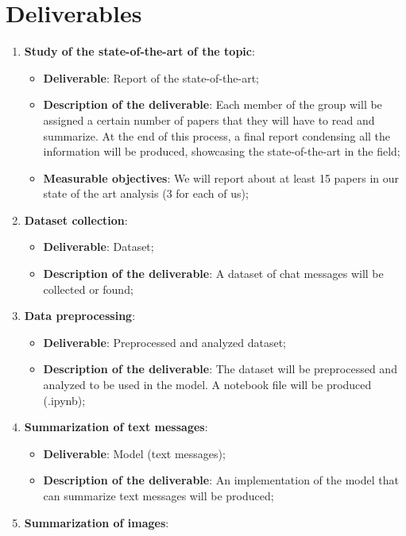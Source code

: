 \documentclass[12pt]{article}
\begin{document}
\section{Deliverables}
\begin{enumerate}
    \item \textbf{Study of the state-of-the-art of the topic}:
    \begin{itemize}
        \item \textbf{Deliverable}: Report of the state-of-the-art;
        \item \textbf{Description of the deliverable}: Each member of the group will be assigned a certain number of papers that 
        they will have to read and summarize. At the end of this process, a final report condensing all the 
        information will be produced, showcasing the state-of-the-art in the field;
        \item \textbf{Measurable objectives}: We will report about at least 15 papers in our state of the art 
        analysis (3 for each of us);
    \end{itemize}
    \item \textbf{Dataset collection}:
    \begin{itemize}
        \item \textbf{Deliverable}: Dataset;
        \item \textbf{Description of the deliverable}: A dataset of chat messages will be collected or found;
    \end{itemize}
    \item \textbf{Data preprocessing}:
    \begin{itemize}
        \item \textbf{Deliverable}: Preprocessed and analyzed dataset;
        \item \textbf{Description of the deliverable}: The dataset will be preprocessed and analyzed to be 
        used in the model. A notebook file will be produced (.ipynb);
    \end{itemize}
    \item \textbf{Summarization of text messages}:
    \begin{itemize}
        \item \textbf{Deliverable}: Model (text messages);
        \item \textbf{Description of the deliverable}: An implementation of the model that can summarize text 
        messages will be produced;
    \end{itemize}
    \item \textbf{Summarization of images}:

\end{enumerate}
\end{document}
